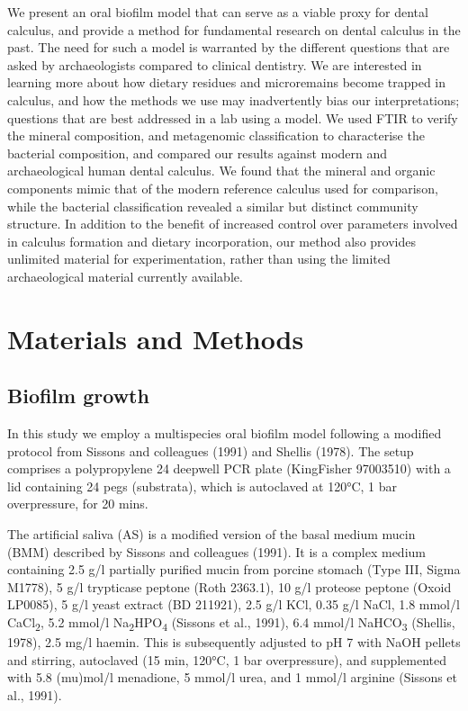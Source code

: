 \documentclass[
]{article}
\begin{document}
We present an oral biofilm model that can serve as a viable proxy for
dental calculus, and provide a method for fundamental research on dental
calculus in the past. The need for such a model is warranted by the
different questions that are asked by archaeologists compared to
clinical dentistry. We are interested in learning more about how dietary
residues and microremains become trapped in calculus, and how the
methods we use may inadvertently bias our interpretations; questions
that are best addressed in a lab using a model. We used FTIR to verify
the mineral composition, and metagenomic classification to characterise
the bacterial composition, and compared our results against modern and
archaeological human dental calculus. We found that the mineral and
organic components mimic that of the modern reference calculus used for
comparison, while the bacterial classification revealed a similar but
distinct community structure. In addition to the benefit of increased
control over parameters involved in calculus formation and dietary
incorporation, our method also provides unlimited material for
experimentation, rather than using the limited archaeological material
currently available.

\hypertarget{materials-and-methods}{%
\section{Materials and Methods}\label{materials-and-methods}}

\hypertarget{biofilm-growth}{%
\subsection{Biofilm growth}\label{biofilm-growth}}

In this study we employ a multispecies oral biofilm model following a
modified protocol from Sissons and colleagues (1991) and Shellis (1978).
The setup comprises a polypropylene 24 deepwell PCR plate (KingFisher
97003510) with a lid containing 24 pegs (substrata), which is autoclaved
at 120°C, 1 bar overpressure, for 20 mins.

The artificial saliva (AS) is a modified version of the basal medium
mucin (BMM) described by Sissons and colleagues (1991). It is a complex
medium containing 2.5 g/l partially purified mucin from porcine stomach
(Type III, Sigma M1778), 5 g/l trypticase peptone (Roth 2363.1), 10 g/l
proteose peptone (Oxoid LP0085), 5 g/l yeast extract (BD 211921), 2.5
g/l KCl, 0.35 g/l NaCl, 1.8 mmol/l CaCl\textsubscript{2}, 5.2 mmol/l
Na\textsubscript{2}HPO\textsubscript{4} (Sissons et al., 1991), 6.4
mmol/l NaHCO\textsubscript{3} (Shellis, 1978), 2.5 mg/l haemin. This is
subsequently adjusted to pH 7 with NaOH pellets and stirring, autoclaved
(15 min, 120°C, 1 bar overpressure), and supplemented with 5.8 (mu)mol/l
menadione, 5 mmol/l urea, and 1 mmol/l arginine (Sissons et al., 1991).
\end{document}
